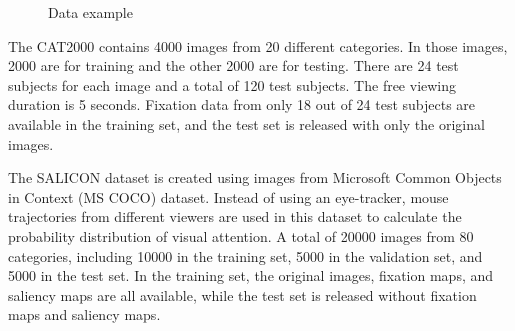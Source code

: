 \documentclass[12pt]{article}
\begin{document}
\begin{figure}[!h]
    \centering
    \hspace{1mm}
    \hspace{1mm}
    \caption{Data example}
    \label{img:data_example_2}
\end{figure}

The CAT2000 contains 4000 images from 20 different categories. In those images, 2000 are for training and the other 2000
are for testing. There are 24 test subjects for each image and a total of 120 test subjects. The free viewing duration is 5 seconds. Fixation data from only 18 out of 24 test subjects are available in the training
set, and the test set is released with only the original images.

The SALICON dataset is created using images from Microsoft Common Objects in Context (MS COCO) dataset\cite{linMicrosoftCOCOCommon2015}.
Instead of using an eye-tracker, mouse trajectories from different viewers are used in this dataset to calculate the probability distribution of visual attention. A total of 20000 images from 80 categories, including
10000 in the training set, 5000 in the validation set, and 5000 in the test set.
In the training set, the original images, fixation maps, and saliency maps are all available, while
the test set is released without fixation maps and saliency maps.
\end{document}
